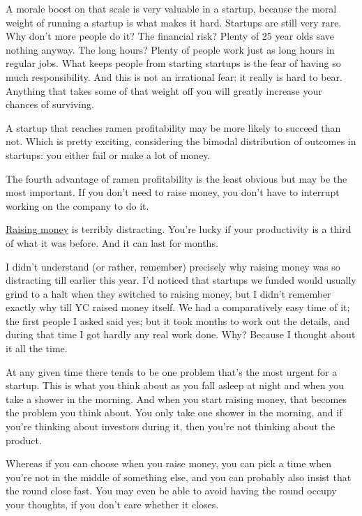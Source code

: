 \documentclass[12pt]{book}
\begin{document}
A morale boost on that scale is very valuable in a startup, because the
moral weight of running a startup is what makes it hard. Startups are
still very rare. Why don't more people do it? The financial risk? Plenty
of 25 year olds save nothing anyway. The long hours? Plenty of people
work just as long hours in regular jobs. What keeps people from starting
startups is the fear of having so much responsibility. And this is not
an irrational fear: it really is hard to bear. Anything that takes some
of that weight off you will greatly increase your chances of surviving.

A startup that reaches ramen profitability may be more likely to succeed
than not. Which is pretty exciting, considering the bimodal distribution
of outcomes in startups: you either fail or make a lot of money.

The fourth advantage of ramen profitability is the least obvious but may
be the most important. If you don't need to raise money, you don't have
to interrupt working on the company to do it.

\href{fundraising.html}{Raising money} is terribly distracting. You're
lucky if your productivity is a third of what it was before. And it can
last for months.

I didn't understand (or rather, remember) precisely why raising money
was so distracting till earlier this year. I'd noticed that startups we
funded would usually grind to a halt when they switched to raising
money, but I didn't remember exactly why till YC raised money itself. We
had a comparatively easy time of it; the first people I asked said yes;
but it took months to work out the details, and during that time I got
hardly any real work done. Why? Because I thought about it all the time.

At any given time there tends to be one problem that's the most urgent
for a startup. This is what you think about as you fall asleep at night
and when you take a shower in the morning. And when you start raising
money, that becomes the problem you think about. You only take one
shower in the morning, and if you're thinking about investors during it,
then you're not thinking about the product.

Whereas if you can choose when you raise money, you can pick a time when
you're not in the middle of something else, and you can probably also
insist that the round close fast. You may even be able to avoid having
the round occupy your thoughts, if you don't care whether it closes.
\end{document}
